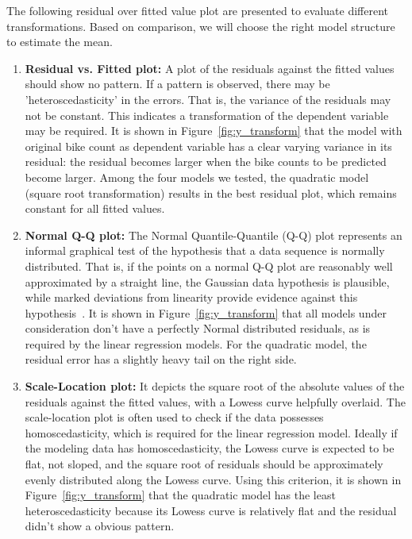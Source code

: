 \documentclass [11pt, proquest] {uwthesis}[2015/03/03]
\begin{document}
The following residual over fitted value plot are presented to evaluate different transformations. Based on comparison, we will choose the right model structure to estimate the mean.
\begin{enumerate}
\item \textbf{Residual vs. Fitted plot:} A plot of the residuals against the fitted values should show no pattern. If a pattern is observed, there may be 'heteroscedasticity' in the errors. That is, the variance of the residuals may not be constant. This indicates a transformation of the dependent variable may be required. It is shown in Figure~\ref{fig:y_transform} that the model with original bike count as dependent variable has a clear varying variance in its residual: the residual becomes larger when the bike counts to be predicted become larger. Among the four  models we tested, the quadratic model (square root transformation) results in the best residual plot, which remains constant for all fitted values. 
\item \textbf{Normal Q-Q plot:} The Normal Quantile-Quantile (Q-Q) plot represents an informal graphical test of the hypothesis that a data sequence is normally distributed. That is, if the points on a normal Q-Q plot are reasonably well approximated by a straight line, the Gaussian data hypothesis is plausible, while marked deviations from linearity provide evidence against this hypothesis~\cite{Pearson2011}. It is shown in Figure~\ref{fig:y_transform} that all models under consideration don't have a perfectly Normal distributed residuals, as is required by the linear regression models. For the quadratic model, the residual error has a slightly heavy tail on the right side. 
\item \textbf{Scale-Location plot:} It depicts the square root of the absolute values of the residuals against the fitted values, with a Lowess curve helpfully overlaid. The scale-location plot is often used to check if the data possesses homoscedasticity, which is required for the linear regression model. Ideally if the modeling data has homoscedasticity, the Lowess curve is expected to be flat, not sloped, and the square root of residuals should be approximately evenly distributed along the Lowess curve. Using this criterion, it is shown in Figure~\ref{fig:y_transform} that the quadratic model has the least heteroscedasticity because its Lowess curve is relatively flat and the residual didn't show a obvious pattern.

\end{enumerate}
\end{document}
